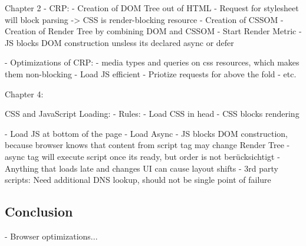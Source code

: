 Chapter 2
- CRP:
- Creation of DOM Tree out of HTML
- Request for stylesheet will block parsing -> CSS is render-blocking resource
- Creation of CSSOM
- Creation of Render Tree by combining DOM and CSSOM
- Start Render Metric
- JS blocks DOM construction unsless its declared async or defer

- Optimizations of CRP:
- media types and queries on css resources, which makes them non-blocking
- Load JS efficient
- Priotize requests for above the fold
- etc. %

Chapter 4:

CSS and JavaScript Loading:
- Rules:
- Load CSS in head
- CSS blocks rendering

- Load JS at bottom of the page
- Load Async
- JS blocks DOM construction, because browser knows that content from script tag may change Render Tree
- async tag will execute script once its ready, but order is not berücksichtigt
- Anything that loads late and changes UI can cause layout shifts
- 3rd party scripts: Need additional DNS lookup, should not be single point of failure














\subsection{Conclusion}







- Browser optimizations...

